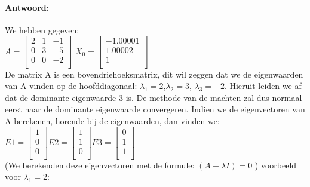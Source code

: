 \documentclass[examenvragen.tex]{subfiles}
\begin{document}
\paragraph{Antwoord:}

We hebben gegeven: \\
$ A =\begin{bmatrix} 
 2 & 1 & -1 \\
 0 & 3 & -5 \\
 0 & 0 & -2\\
\end{bmatrix}$
$ X_0 = \begin{bmatrix}
-1.00001 \\
1.00002 \\
1 \\
\end{bmatrix} $ \\
De matrix A is een bovendriehoeksmatrix, dit wil zeggen dat we de eigenwaarden van A vinden op de hoofddiagonaal: $\lambda_1 = 2$,$\lambda_2 = 3$, $\lambda_3 = -2$. Hieruit leiden we af dat de dominante eigenwaarde 3 is. De methode van de machten zal dus normaal eerst naar de dominante eigenwaarde convergeren. Indien we de eigenvectoren van A berekenen, horende bij de eigenwaarden, dan vinden we: \\

$ E1 = \begin{bmatrix}
1 \\
0 \\
0 \\
\end{bmatrix} E2 = \begin{bmatrix}
1 \\
1 \\
0 \\
\end{bmatrix}  E3 = \begin{bmatrix}
0\\
1 \\
1 \\
\end{bmatrix}$ \\

(We berekenden deze eigenvectoren met de formule: $(A-\lambda I)=0$ ) voorbeeld voor $\lambda_1 = 2$:
\end{document}
